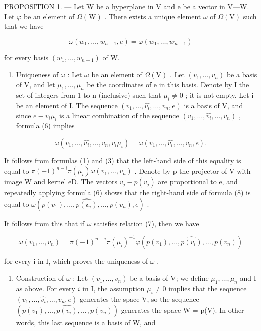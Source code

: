 PROPOSITION 1. --- Let W be a hyperplane in V and e be a vector in V---W. Let \(\varphi\) be an element of \(\Omega(\mathrm{W})\) . There exists a unique element \(\omega\) of \(\Omega(\mathrm{V})\) such that we have

\[
\omega (w _ {1}, \ldots , w _ {n - 1}, e) = \varphi (w _ {1}, \ldots , w _ {n - 1})\tag{7}
\]

for every basis \((w_{1},\ldots ,w_{n - 1})\) of W.

\begin{enumerate}
\def\labelenumi{\Alph{enumi})}
\tightlist
\item
  Uniqueness of \(\omega\) : Let \(\omega\) be an element of \(\Omega(\mathrm{V})\) . Let \((v_{1},\ldots,v_{n})\) be a basis of V, and let \(\mu_{1},\ldots,\mu_{n}\) be the coordinates of e in this basis. Denote by I the set of integers from 1 to n (inclusive) such that \(\mu_{i}\neq0\) ; it is not empty. Let i be an element of I. The sequence \((v_{1},\ldots,\widehat{v_{i}},\ldots,v_{n},e)\) is a basis of V, and since \(e-v_{i}\mu_{i}\) is a linear combination of the sequence \((v_{1},\ldots,\widehat{v_{i}},\ldots,v_{n})\) , formula (6) implies
\end{enumerate}

\[
\omega (v _ {1}, \ldots , \widehat {v _ {i}}, \ldots , v _ {n}, v _ {i} \mu_ {i}) = \omega (v _ {1}, \ldots , \widehat {v _ {i}}, \ldots , v _ {n}, e).\tag{8}
\]

It follows from formulas (1) and (3) that the left-hand side of this equality is equal to \(\pi(-1)^{n-i}\pi(\mu_i)\omega(v_1,\ldots,v_n)\) . Denote by p the projector of V with image W and kernel eD. The vectors \(v_j - p(v_j)\) are proportional to e, and repeatedly applying formula (6) shows that the right-hand side of formula (8) is equal to \(\omega(p(v_1),\ldots,\widehat{p(v_i)},\ldots,p(v_n),e)\) .

It follows from this that if \(\omega\) satisfies relation (7), then we have

\[
\omega (v _ {1}, \dots , v _ {n}) = \pi (- 1) ^ {n - i} \pi (\mu_ {i}) ^ {- 1} \varphi (p (v _ {1}), \dots , \widehat {p (v _ {i})}, \dots , p (v _ {n}))\tag{9}
\]

for every i in I, which proves the uniqueness of \(\omega\) .

\begin{enumerate}
\def\labelenumi{\Alph{enumi})}
\setcounter{enumi}{1}
\tightlist
\item
  Construction of \(\omega\) : Let \((v_{1},\ldots,v_{n})\) be a basis of V; we define \(\mu_{1},\ldots,\mu_{n}\) and I as above. For every \(i\) in I, the assumption \(\mu_{i}\neq0\) implies that the sequence \((v_{1},\ldots,\widehat{v_{i}},\ldots,v_{n},e)\) generates the space V, so the sequence \((p(v_{1}),\ldots,\widehat{p(v_{i})},\ldots,p(v_{n}))\) generates the space W = p(V). In other words, this last sequence is a basis of W, and
\end{enumerate}

